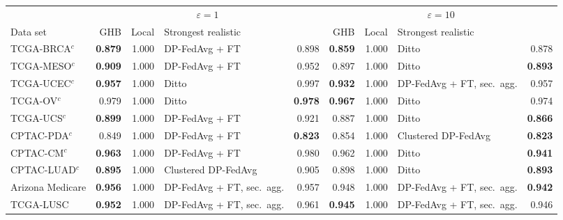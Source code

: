 \begin{tabular}{lrrlrrrlr}
\toprule
 & \multicolumn{4}{c}{$\varepsilon=1$} & \multicolumn{4}{c}{$\varepsilon=10$} \\
\cmidrule(lr){2-5}\cmidrule(l){6-9}
Data set & GHB & Local & \multicolumn{2}{l}{Strongest realistic} & GHB & Local & \multicolumn{2}{l}{Strongest realistic} \\
\midrule
TCGA-BRCA$^{c}$ & \textbf{0.879} & 1.000 & DP-FedAvg + FT \cite{mcmahan2018learning} & 0.898 & \textbf{0.859} & 1.000 & Ditto \cite{li2021ditto} & 0.878 \\
TCGA-MESO$^{c}$ & \textbf{0.909} & 1.000 & DP-FedAvg + FT \cite{mcmahan2018learning} & 0.952 & 0.897 & 1.000 & Ditto \cite{li2021ditto} & \textbf{0.893} \\
TCGA-UCEC$^{c}$ & \textbf{0.957} & 1.000 & Ditto \cite{li2021ditto} & 0.997 & \textbf{0.932} & 1.000 & DP-FedAvg + FT, sec.\ agg. \cite{mcmahan2018learning,bonawitz2017practical} & 0.957 \\
TCGA-OV$^{c}$ & 0.979 & 1.000 & Ditto \cite{li2021ditto} & \textbf{0.978} & \textbf{0.967} & 1.000 & Ditto \cite{li2021ditto} & 0.974 \\
TCGA-UCS$^{c}$ & \textbf{0.899} & 1.000 & DP-FedAvg + FT \cite{mcmahan2018learning} & 0.921 & 0.887 & 1.000 & Ditto \cite{li2021ditto} & \textbf{0.866} \\
CPTAC-PDA$^{c}$ & 0.849 & 1.000 & DP-FedAvg + FT \cite{mcmahan2018learning} & \textbf{0.823} & 0.854 & 1.000 & Clustered DP-FedAvg \cite{ghosh2020efficient,mcmahan2018learning} & \textbf{0.823} \\
CPTAC-CM$^{c}$ & \textbf{0.963} & 1.000 & DP-FedAvg + FT \cite{mcmahan2018learning} & 0.980 & 0.962 & 1.000 & Ditto \cite{li2021ditto} & \textbf{0.941} \\
CPTAC-LUAD$^{c}$ & \textbf{0.895} & 1.000 & Clustered DP-FedAvg \cite{ghosh2020efficient,mcmahan2018learning} & 0.905 & 0.898 & 1.000 & Ditto \cite{li2021ditto} & \textbf{0.893} \\
Arizona Medicare & \textbf{0.956} & 1.000 & DP-FedAvg + FT, sec.\ agg. \cite{mcmahan2018learning,bonawitz2017practical} & 0.957 & 0.948 & 1.000 & DP-FedAvg + FT, sec.\ agg. \cite{mcmahan2018learning,bonawitz2017practical} & \textbf{0.942} \\
TCGA-LUSC & \textbf{0.952} & 1.000 & DP-FedAvg + FT, sec.\ agg. \cite{mcmahan2018learning,bonawitz2017practical} & 0.961 & \textbf{0.945} & 1.000 & DP-FedAvg + FT, sec.\ agg. \cite{mcmahan2018learning,bonawitz2017practical} & 0.946 \\

\end{tabular}
